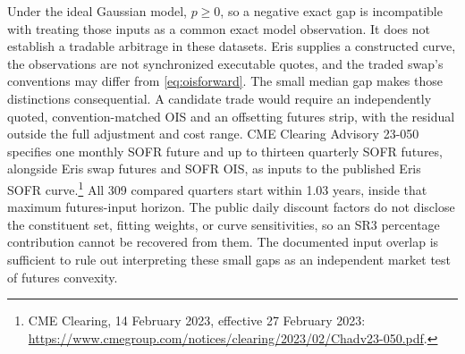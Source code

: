 Under the ideal Gaussian model, $p\geq0$, so a negative exact gap is incompatible with treating those inputs as a common exact model observation. It does not establish a tradable arbitrage in these datasets. Eris supplies a constructed curve, the observations are not synchronized executable quotes, and the traded swap's conventions may differ from \eqref{eq:oisforward}. The small median gap makes those distinctions consequential. A candidate trade would require an independently quoted, convention-matched OIS and an offsetting futures strip, with the residual outside the full adjustment and cost range. CME Clearing Advisory 23-050 specifies one monthly SOFR future and up to thirteen quarterly SOFR futures, alongside Eris swap futures and SOFR OIS, as inputs to the published Eris SOFR curve.\footnote{CME Clearing, 14 February 2023, effective 27 February 2023: \url{https://www.cmegroup.com/notices/clearing/2023/02/Chadv23-050.pdf}.} All 309 compared quarters start within 1.03 years, inside that maximum futures-input horizon. The public daily discount factors do not disclose the constituent set, fitting weights, or curve sensitivities, so an SR3 percentage contribution cannot be recovered from them. The documented input overlap is sufficient to rule out interpreting these small gaps as an independent market test of futures convexity.


